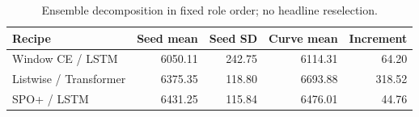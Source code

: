 \begin{table}[!htbp]
\centering\small
\caption{Ensemble decomposition in fixed role order; no headline reselection.}\label{tab:bags}
\begin{tabularx}{\linewidth}{@{}Xrrrr@{}}
\toprule
Recipe & Seed mean & Seed SD & Curve mean & Increment \\
\midrule
Window CE / LSTM & 6050.11 & 242.75 & 6114.31 & 64.20 \\
Listwise / Transformer & 6375.35 & 118.80 & 6693.88 & 318.52 \\
SPO+ / LSTM & 6431.25 & 115.84 & 6476.01 & 44.76 \\
\bottomrule
\end{tabularx}
\par\vspace{3pt}{\footnotesize Every recipe uses seeds 42--46. Seed SD describes these five fits, not uncertainty over future periods.}
\end{table}
